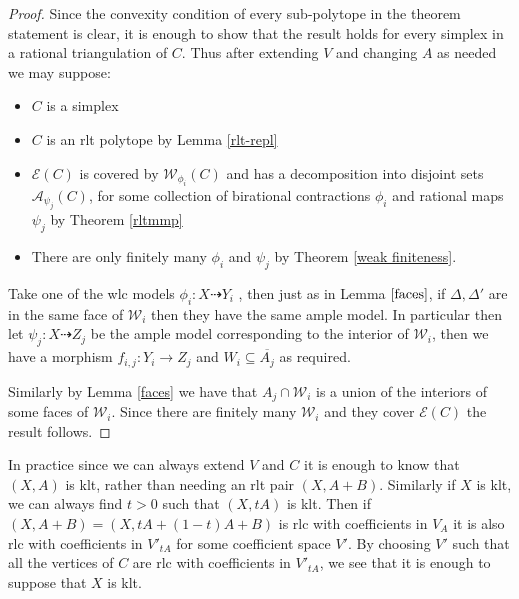 	\begin{proof}
		
		Since the convexity condition of every sub-polytope in the theorem statement is clear, it is enough to show that the result holds for every simplex in a rational triangulation of $C$. Thus after extending $V$ and changing $A$ as needed we may suppose:
		
		\begin{itemize}
			\item $C$ is a simplex 
			\item $C$ is an rlt polytope by Lemma \ref{rlt-repl}
			\item $\mathcal{E}(C)$ is covered by $\mathcal{W}_{\phi_{i}}(C)$  and has a decomposition into disjoint sets $\mathcal{A}_{\psi_{j}}(C)$,
			for some collection of birational contractions $\phi_{i}$ and rational maps $\psi_{j}$ by Theorem \ref{rltmmp} 
			\item There are only finitely many $\phi_{i}$ and $\psi_{j}$ by Theorem \ref{weak finiteness}.
		\end{itemize}
			
		Take one of the wlc models $\phi_{i}:X \dashrightarrow Y_{i}$ , then just as in Lemma $\ref{faces}$, if $\Delta,\Delta'$ are in the same face of $\mathcal{W}_{i}$ then they have the same ample model. In particular then let $\psi_{j}:X \dashrightarrow Z_{j}$ be the ample model corresponding to the interior of $\mathcal{W}_{i}$, then we have a morphism $f_{i,j}: Y_{i} \to Z_{j}$ and  $W_{i} \subseteq \overline{A_{j}}$ as required. 
		
		Similarly by Lemma \ref{faces} we have that $A_{j} \cap \mathcal{W}_{i}$ is a union of the interiors of some faces of $\mathcal{W}_{i}$. Since there are finitely many $\mathcal{W}_{i}$ and they cover $\mathcal{E}(C)$ the result follows.
	\end{proof}

	\begin{remark}
		In practice since we can always extend $V$ and $C$ it is enough to know that $(X,A)$ is klt, rather than needing an rlt pair $(X,A+B)$. Similarly if $X$ is klt, we can always find $t>0$ such that $(X,tA)$ is klt. Then if $(X,A+B)=(X,tA+(1-t)A+B)$ is rlc with coefficients in $V_{A}$ it is also rlc with coefficients in $V'_{tA}$ for some coefficient space $V'$. By choosing $V'$ such that all the vertices of $C$ are rlc with coefficients in $V'_{tA}$, we see that it is enough to suppose that $X$ is klt.
	\end{remark}


